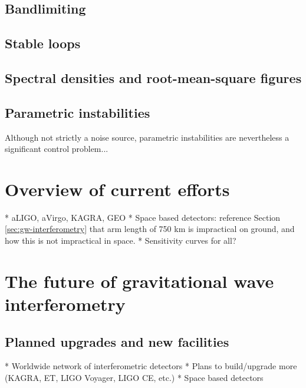 
\subsection{Bandlimiting}

\subsection{\label{sec:gain-phase-margin}Stable loops}

\subsection{Spectral densities and root-mean-square figures}

\subsection{Parametric instabilities}
Although not strictly a noise source, parametric instabilities are nevertheless a significant control problem...

\section{Overview of current efforts}
* aLIGO, aVirgo, KAGRA, GEO
* Space based detectors: reference Section\,\ref{sec:gw-interferometry} that arm length of 750 km is impractical on ground, and how this is not impractical in space.
* Sensitivity curves for all?

\section{The future of gravitational wave interferometry}

\subsection{Planned upgrades and new facilities}
* Worldwide network of interferometric detectors
* Plans to build/upgrade more (KAGRA, ET, LIGO Voyager, LIGO CE, etc.)
* Space based detectors

